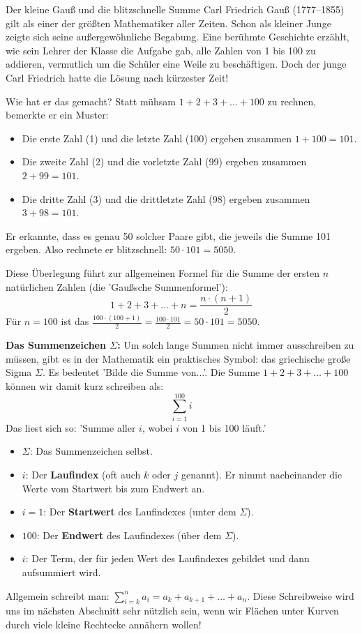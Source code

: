 \begin{funfactbox}{Der kleine Gauß und die blitzschnelle Summe}
Carl Friedrich Gauß (1777--1855) gilt als einer der größten Mathematiker aller Zeiten. Schon als kleiner Junge zeigte sich seine außergewöhnliche Begabung. Eine berühmte Geschichte erzählt, wie sein Lehrer der Klasse die Aufgabe gab, alle Zahlen von 1 bis 100 zu addieren, vermutlich um die Schüler eine Weile zu beschäftigen. Doch der junge Carl Friedrich hatte die Lösung nach kürzester Zeit!

Wie hat er das gemacht? Statt mühsam $1+2+3+\dots+100$ zu rechnen, bemerkte er ein Muster:
\begin{itemize}
    \item Die erste Zahl (1) und die letzte Zahl (100) ergeben zusammen $1+100 = 101$.
    \item Die zweite Zahl (2) und die vorletzte Zahl (99) ergeben zusammen $2+99 = 101$.
    \item Die dritte Zahl (3) und die drittletzte Zahl (98) ergeben zusammen $3+98 = 101$.
\end{itemize}
Er erkannte, dass es genau 50 solcher Paare gibt, die jeweils die Summe 101 ergeben. Also rechnete er blitzschnell: $50 \cdot 101 = 5050$.

Diese Überlegung führt zur allgemeinen Formel für die Summe der ersten $n$ natürlichen Zahlen (die 'Gaußsche Summenformel'):
\[ 1 + 2 + 3 + \dots + n = \frac{n \cdot (n+1)}{2} \]
Für $n=100$ ist das $\frac{100 \cdot (100+1)}{2} = \frac{100 \cdot 101}{2} = 50 \cdot 101 = 5050$.

\textbf{Das Summenzeichen $\Sigma$:}
Um solch lange Summen nicht immer ausschreiben zu müssen, gibt es in der Mathematik ein praktisches Symbol: das griechische große Sigma $\Sigma$. Es bedeutet 'Bilde die Summe von...'.
Die Summe $1+2+3+\dots+100$ können wir damit kurz schreiben als:
\[ \sum_{i=1}^{100} i \]
Das liest sich so: 'Summe aller $i$, wobei $i$ von 1 bis 100 läuft.'
\begin{itemize}
    \item $\Sigma$: Das Summenzeichen selbst.
    \item $i$: Der \textbf{Laufindex} (oft auch $k$ oder $j$ genannt). Er nimmt nacheinander die Werte vom Startwert bis zum Endwert an.
    \item $i=1$: Der \textbf{Startwert} des Laufindexes (unter dem $\Sigma$).
    \item $100$: Der \textbf{Endwert} des Laufindexes (über dem $\Sigma$).
    \item $i$: Der Term, der für jeden Wert des Laufindexes gebildet und dann aufsummiert wird.
\end{itemize}
Allgemein schreibt man: $\sum_{i=k}^{n} a_i = a_k + a_{k+1} + \dots + a_n$.
Diese Schreibweise wird uns im nächsten Abschnitt sehr nützlich sein, wenn wir Flächen unter Kurven durch viele kleine Rechtecke annähern wollen!
\end{funfactbox}


